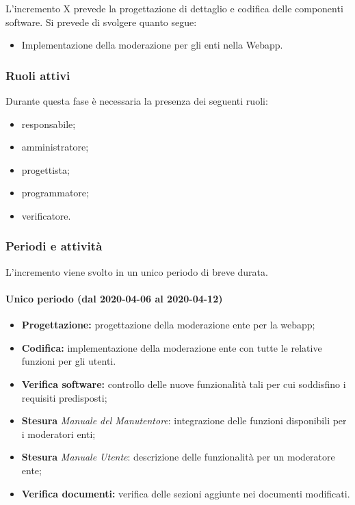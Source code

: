 			L'incremento X prevede la progettazione di dettaglio e codifica delle componenti software. Si prevede di svolgere quanto segue:
			\begin{itemize}
				\item Implementazione della moderazione per gli enti nella Webapp.
			\end{itemize}
			
			\subsubsection{Ruoli attivi}
			
				Durante questa fase è necessaria la presenza dei seguenti ruoli:
				\begin{itemize}
					\item responsabile;
					\item amministratore;
					\item progettista;
					\item programmatore;
					\item verificatore.
				\end{itemize}
			
			\subsubsection{Periodi e attività}
			
				L'incremento viene svolto in un unico periodo di breve durata.
				
				\paragraph{Unico periodo (dal 2020-04-06 al 2020-04-12)}
				
					\begin{itemize}
						\item \textbf{Progettazione:} progettazione della moderazione ente per la webapp;
						\item \textbf{Codifica:} implementazione della moderazione ente con tutte le relative funzioni per gli utenti.
						\item \textbf{Verifica software:} controllo delle nuove funzionalità tali per cui soddisfino i requisiti predisposti;
						\item \textbf{Stesura} \textit{Manuale del Manutentore}: integrazione delle funzioni disponibili per i moderatori enti;
						\item \textbf{Stesura} \textit{Manuale Utente}: descrizione delle funzionalità per un moderatore ente;
						\item \textbf{Verifica documenti:} verifica delle sezioni aggiunte nei documenti modificati.
					\end{itemize} 			

